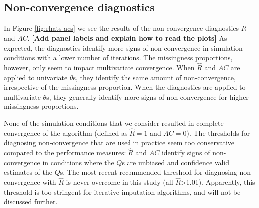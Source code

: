 \documentclass[Royal,times,sageh]{sagej}
\begin{document}
\hypertarget{non-convergence-diagnostics}{%
\subsection{Non-convergence diagnostics}\label{non-convergence-diagnostics}}

In Figure \ref{fig:rhats-acs} we see the results of the non-convergence diagnostics \(\widehat{R}\) and \(AC\). \textbf{{[}Add panel labels and explain how to read the plots{]}} As expected, the diagnostics identify more signs of non-convergence in simulation conditions with a lower number of iterations. The missingness proportions, however, only seem to impact multivariate convergence. When \(\widehat{R}\) and \(AC\) are applied to univariate \(\theta\)s, they identify the same amount of non-convergence, irrespective of the missingness proportion. When the diagnostics are applied to multivariate \(\theta\)s, they generally identify more signs of non-convergence for higher missingness proportions.

None of the simulation conditions that we consider resulted in complete convergence of the algorithm (defined as \(\widehat{R}=1\) and \(AC=0\)). The thresholds for diagnosing non-convergence that are used in practice seem too conservative compared to the performance measures: \(\widehat{R}\) and \(AC\) identify signs of non-convergence in conditions where the \(\bar{Q}\)s are unbiased and confidence valid estimates of the \(Q\)s. The most recent recommended threshold for diagnosing non-convergence with \(\widehat{R}\) is never overcome in this study (all \(\widehat{R}\)\textgreater1.01). Apparently, this threshold is too stringent for iterative imputation algorithms, and will not be discussed further.
\end{document}
